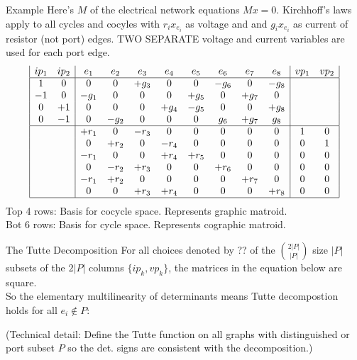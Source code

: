 \documentclass{beamer}
\begin{document}
\begin{frame}{Example}
Here's $M$ of the electrical network equations $Mx=0$.   Kirchhoff's laws
apply to all cycles and cocyles with $r_ix_{e_i}$ as voltage and 
and $g_ix_{e_i}$ as current of resistor (not port) edges.  TWO SEPARATE 
voltage and
current variables are used for each port edge.
\[
\begin{array}{|cc|cccccccc|cc|}
ip_1 & ip_2  & e_1 & e_2 & e_3 & e_4 & e_5 & e_6 & e_7 & e_8 & vp_1 & vp_2 \\ \hline
 1   &  0   &  0  &  0  &+g_3 &  0  &  0  &-g_6 &  0  &-g_8 &      &      \\
-1   &  0   &-g_1 &  0  &  0  &  0  &+g_5 &  0  &+g_7 &  0  &      &      \\
 0   & +1   &  0  &  0  &  0  &+g_4 &-g_5 &  0  &  0  &+g_8 &      &      \\
 0   & -1   &  0  &-g_2 &  0  &  0  &  0  & g_6 &+g_7 & g_8 &      &   \\ \hline
     &      &+r_1 &  0  &-r_3 &  0  &  0  &  0  &  0  &  0  &  1   &  0   \\
     &      &  0  &+r_2 &  0  &-r_4 &  0  &  0  &  0  &  0  &  0   &  1   \\
     &      &-r_1 &  0  &  0  &+r_4 &+r_5 &  0  &  0  &  0  &  0   &  0   \\
     &      &  0  &-r_2 &+r_3 &  0  &  0  &+r_6 &  0  &  0  &  0   &  0   \\
     &      &-r_1 &+r_2 &  0  &  0  &  0  &  0  &+r_7 &  0  &  0   &  0   \\
     &      &  0  &  0  &+r_3 &+r_4 &  0  &  0  &  0  &+r_8 &  0   &  0\\ \hline 
\end{array}
\]
Top 4 rows: Basis for cocycle space. Represents graphic matroid.\\
Bot 6 rows: Basis for cycle space. Represents cographic matroid.\\
\end{frame}

\begin{frame}{The Tutte Decomposition}
For all choices denoted by ?? of the $\binom{2|P|}{|P|}$ size $|P|$ subsets of
the $2|P|$ columns $\{ip_k, vp_k\}$, the matrices in the equation below are
square.\\
So the elementary multilinearity of determinants
means Tutte decompostion holds for all $e_i\not\in P$:
  


(Technical detail:  Define the Tutte function on all graphs with 
distinguished or port subset $P$ so the det. signs are consistent 
with the decomposition.)
\end{frame}
\end{document}
